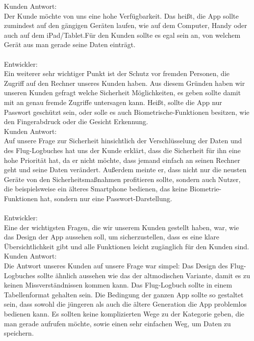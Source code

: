 \documentclass[a4paper]{article} %
\begin{document}
    \noindent Kunden Antwort:\\
    Der Kunde möchte von uns eine hohe Verfügbarkeit. 
    Das heißt, die App sollte zumindest auf den gängigen Geräten laufen, wie auf dem Computer, Handy oder auch auf dem iPad/Tablet.Für den Kunden sollte es egal sein an, von welchem Gerät aus man gerade seine Daten einträgt.\\
    \vspace{0.5cm}\\
    \noindent Entwickler:\\
    Ein weiterer sehr wichtiger Punkt ist der Schutz vor fremden Personen, die Zugriff auf den Rechner unseres Kunden haben. Aus diesem Gründen haben wir unseren Kunden gefragt welche Sicherheit Möglichkeiten, es geben sollte damit mit an genau fremde Zugriffe untersagen kann. Heißt, sollte die App nur Passwort geschützt sein, oder solle es auch Biometrische-Funktionen besitzen, wie den Fingerabdruck oder die Gesicht Erkennung.\\
    
    \noindent Kunden Antwort:\\
    Auf unsere Frage zur Sicherheit hinsichtlich der Verschlüsselung der Daten und des Flug-Logbuches hat uns der Kunde erklärt, dass die Sicherheit für ihn eine hohe Priorität hat, da er nicht möchte, dass jemand einfach an seinen Rechner geht und seine Daten verändert. Außerdem meinte er, dass nicht nur die neusten Geräte von den Sicherheitsmaßnahmen profitieren sollte, sondern auch Nutzer, die beispielsweise ein älteres Smartphone bedienen, das keine Biometrie-Funktionen hat, sondern nur eine Passwort-Darstellung.\\
    \vspace{0.5cm}\\
    \noindent Entwickler:\\
    Eine der wichtigsten Fragen, die wir unserem Kunden gestellt haben, war, wie das Design der App aussehen soll, um sicherzustellen, dass es eine klare Übersichtlichkeit gibt und alle Funktionen leicht zugänglich für den Kunden sind.\\
    
    \noindent Kunden Antwort:\\
    Die Antwort unseres Kunden auf unsere Frage war simpel: Das Design des Flug-Logbuches sollte ähnlich aussehen wie das der altmodischen Variante, damit es zu keinen Missverständnissen kommen kann. Das Flug-Logbuch sollte in einem Tabellenformat gehalten sein. Die Bedingung der ganzen App sollte so gestaltet sein, dass sowohl die jüngeren als auch die ältere Generation die App problemlos bedienen kann. Es sollten keine komplizierten Wege zu der Kategorie geben, die man gerade aufrufen möchte, sowie einen sehr einfachen Weg, um Daten zu speichern.\\
    \pagebreak
    
\end{document}
